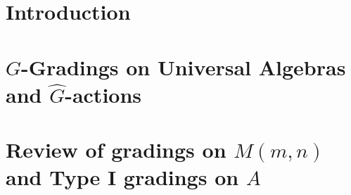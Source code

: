 \documentclass[12pt]{pdfathesis}
\def\biblio{}
\begin{document}
%
\def\biblio{}
%

%
\chapter{Introduction}

\chapter{$G$-Gradings on Universal Algebras and $\widehat G$-actions}
\chapter{Review of gradings on $M(m,n)$ and Type I gradings on $A$}

%

\end{document}
